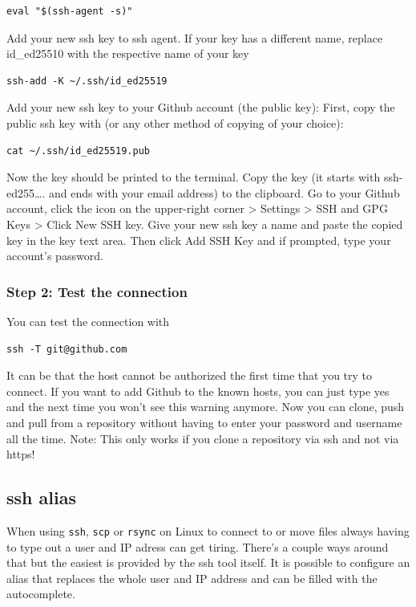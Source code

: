 \documentclass[
]{book}
\begin{document}
\begin{verbatim}
eval "$(ssh-agent -s)"
\end{verbatim}

Add your new ssh key to ssh agent. If your key has a different name,
replace id\_ed25510 with the respective name of your key

\begin{verbatim}
ssh-add -K ~/.ssh/id_ed25519
\end{verbatim}

Add your new ssh key to your Github account (the public key): First,
copy the public ssh key with (or any other method of copying of your
choice):

\begin{verbatim}
cat ~/.ssh/id_ed25519.pub
\end{verbatim}

Now the key should be printed to the terminal. Copy the key (it starts
with ssh-ed255\ldots. and ends with your email address) to the clipboard.
Go to your Github account, click the icon on the upper-right corner \textgreater{}
Settings \textgreater{} SSH and GPG Keys \textgreater{} Click New SSH key. Give your new ssh key
a name and paste the copied key in the key text area. Then click Add SSH
Key and if prompted, type your account's password.

\subsubsection{Step 2: Test the connection}\label{step-2-test-the-connection}

You can test the connection with

\begin{verbatim}
ssh -T git@github.com
\end{verbatim}

It can be that the host cannot be authorized the first time that you try
to connect. If you want to add Github to the known hosts, you can just
type yes and the next time you won't see this warning anymore. Now you
can clone, push and pull from a repository without having to enter your
password and username all the time. Note: This only works if you clone a
repository via ssh and not via https!

\subsection{ssh alias}\label{ssh-alias}

When using \texttt{ssh}, \texttt{scp} or \texttt{rsync} on Linux to connect to or move files
always having to type out a user and IP adress can get tiring. There's a
couple ways around that but the easiest is provided by the ssh tool
itself. It is possible to configure an alias that replaces the whole
user and IP address and can be filled with the autocomplete.
\end{document}
